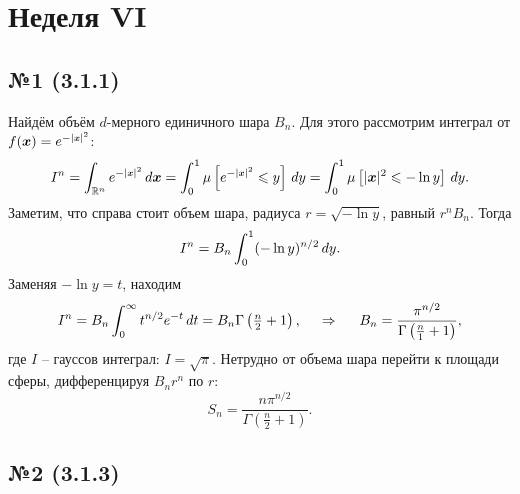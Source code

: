 \section{Неделя VI}





\subsection*{№1 (3.1.1)}

Найдём объём $d$-мерного единичного шара $B_n$. Для этого рассмотрим интеграл от $f(\vc{x}) = e^{-|\smallvc{x}|^2}$:
\begin{equation*}
    I^n = \int_{\mathbb{R}^n} e^{-|\smallvc{x}|^2} \d \vc{x} = \int_0^1 \mu\left[e^{-|\smallvc{x}|^2} \leq y\right] \d y = \int_{0}^{1} \mu\left[|\vc{x}|^2 \leq - \ln y\right] \d y.
\end{equation*}
Заметим, что справа стоит объем шара, радиуса $r = \sqrt{-\ln y}$, равный $r^{n} B_n$. Тогда
\begin{equation*}
    I^n = B_n \int_{0}^{1} (- \ln y)^{n/2} \, d y.  
\end{equation*}
Заменяя $- \ln y = t$, находим
\begin{equation*}
    I^n = B_n \int_{0}^{\infty} t^{n/2} e^{-t} \, d t = B_n \Gamma\left(\tfrac{n}{2}+1\right),
    \hspace{0.5cm} \Rightarrow \hspace{0.5cm}
    B_n = \frac{\pi^{n/2}}{\Gamma\left(\tfrac{n}{1}+1\right)},
\end{equation*}
где $I$ -- гауссов интеграл: $I = \sqrt{\pi}$. Нетрудно от объема шара перейти к площади сферы, дифференцируя $B_n r^n$ по $r$:
\begin{equation*}
    S_n = \frac{n \pi^{n/2}}{ \Gamma\left(\tfrac{n}{2}+1\right)}.
\end{equation*}




\subsection*{№2 (3.1.3)}

